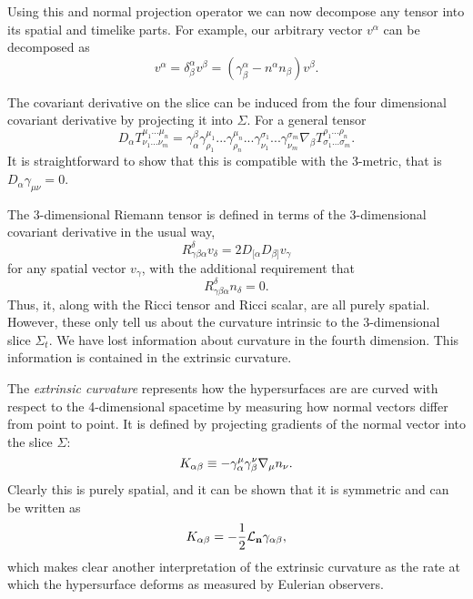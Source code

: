 Using this and normal projection operator we can now decompose any tensor into its spatial and timelike parts. For example, our arbitrary vector $v^\alpha$ can be decomposed as 
\begin{equation}
v^\alpha = \delta^\alpha_\beta v^\beta = (\gamma^\alpha_\beta - n^\alpha n_\beta)v^\beta.
\end{equation}

The covariant derivative on the slice can be induced from the four dimensional covariant derivative by projecting it into $\Sigma$. For a general tensor
\begin{equation}
D_\alpha T^{\mu_1 ... \mu_n}_{\nu_1 ... \nu_m}=\gamma^{\beta}_{\alpha} \gamma^{\mu_1}_{\rho_1}... \gamma^{\mu_n}_{\rho_n}...\gamma^{\sigma_1}_{\nu_1}... \gamma^{\sigma_m}_{\nu_m}\nabla_\beta T^{\rho_1 ... \rho_n}_{\sigma_1 ... \sigma_m}.
\end{equation}
It is straightforward to show that this is compatible with the 3-metric, that is $D_\alpha \gamma_{\mu \nu}=0$.  

The 3-dimensional Riemann tensor is defined in terms of the 3-dimensional covariant derivative in the usual way,
\begin{equation}
\label{eq:3Riemann}
R^{\delta}_{\gamma \beta \alpha} v_\delta = 2 D_{[\alpha} D_{\beta]} v_\gamma 
\end{equation}
for any spatial vector $v_\gamma$, with the additional requirement that 
\begin{equation}
R^{\delta}_{\gamma \beta \alpha}n_\delta =0.
\end{equation}
Thus, it, along with the Ricci tensor and Ricci scalar, are all purely spatial. However, these only tell us about the curvature intrinsic to the 3-dimensional slice $\Sigma_t$. We have lost information about curvature in the fourth dimension. This information is contained in the extrinsic curvature.

The \textit{extrinsic curvature} represents how the hypersurfaces are are curved with respect to the 4-dimensional spacetime by measuring how normal vectors differ from point to point.  It is defined by projecting gradients of the normal vector into the slice $\Sigma$:
\begin{equation}\label{eq:ExtCurve}
K_{\alpha \beta} \equiv -\gamma_{\alpha}^{\mu} \gamma_{\beta}^{\nu} {\nabla} _{\mu} n_{\nu}. 
\end{equation}
Clearly this is purely spatial, and it can be shown \cite{BaumgarteShapiro} that it is symmetric and can
be written as 
\begin{equation}
\label{eq:ExtCurve3}
K_{\alpha \beta}=-\frac{1}{2} {\mathcal{L}}_{\mathbf{n}} \gamma_{\alpha \beta},
\end{equation}
which makes clear another interpretation of the extrinsic curvature as the rate at which the hypersurface deforms as measured by Eulerian observers.


